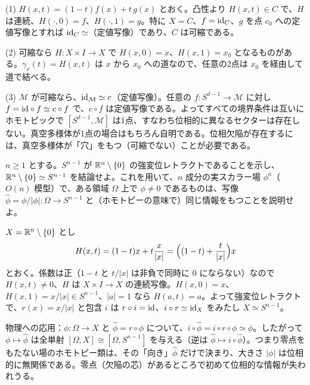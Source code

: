 \begin{solution}
(1) $H(x,t)=(1-t)f(x)+t\,g(x)$ とおく。凸性より $H(x,t)\in C$ で、$H$ は連続、$H(\cdot,0)=f$、$H(\cdot,1)=g$。特に $X=C$、$f=\mathrm{id}_C$、$g$ を点 $c_0$ への定値写像とすれば $\mathrm{id}_C\simeq$（定値写像）であり、$C$ は可縮である。

(2) 可縮なら $H\colon X\times I\to X$ で $H(x,0)=x$、$H(x,1)=x_0$ となるものがある。$\gamma_x(t)=H(x,t)$ は $x$ から $x_0$ への道なので、任意の2点は $x_0$ を経由して道で結べる。

(3) $\mathcal{M}$ が可縮なら、$\mathrm{id}_{\mathcal{M}}\simeq c$（定値写像）。任意の $f\colon S^{d-1}\to\mathcal{M}$ に対し $f=\mathrm{id}\circ f\simeq c\circ f$ で、$c\circ f$ は定値写像である。よってすべての境界条件は互いにホモトピックで $[S^{d-1},\mathcal{M}]$ は1点、すなわち位相的に異なるセクターは存在しない。真空多様体が1点の場合はもちろん自明である。位相欠陥が存在するには、真空多様体が「穴」をもつ（可縮でない）ことが必要である。
\end{solution}

\begin{problem}[難易度 B]\label{ch01-prob-punct}
$n\ge1$ とする。$S^{n-1}$ が $\mathbb{R}^n\setminus\{0\}$ の強変位レトラクトであることを示し、$\mathbb{R}^n\setminus\{0\}\simeq S^{n-1}$ を結論せよ。これを用いて、$n$ 成分の実スカラー場 $\phi^a$（$O(n)$ 模型）で、ある領域 $\Omega$ 上で $\phi\neq0$ であるものは、写像 $\hat\phi=\phi/\lvert\phi\rvert\colon\Omega\to S^{n-1}$ と（ホモトピーの意味で）同じ情報をもつことを説明せよ。
\end{problem}

\begin{solution}
$X=\mathbb{R}^n\setminus\{0\}$ とし
\[
H(x,t)=(1-t)x+t\frac{x}{\lvert x\rvert}=\Bigl((1-t)+\frac{t}{\lvert x\rvert}\Bigr)x
\]
とおく。係数は正（$1-t$ と $t/\lvert x\rvert$ は非負で同時に $0$ にならない）なので $H(x,t)\neq0$、$H$ は $X\times I\to X$ の連続写像。$H(x,0)=x$、$H(x,1)=x/\lvert x\rvert\in S^{n-1}$、$\lvert a\rvert=1$ なら $H(a,t)=a$。よって強変位レトラクトで、$r(x)=x/\lvert x\rvert$ と包含 $i$ は $r\circ i=\mathrm{id}$、$i\circ r\simeq\mathrm{id}_X$ をみたし $X\simeq S^{n-1}$。

物理への応用：$\phi\colon\Omega\to X$ と $\hat\phi=r\circ\phi$ について、$i\circ\hat\phi=i\circ r\circ\phi\simeq\phi$。したがって $\phi\mapsto\hat\phi$ は全単射 $[\Omega,X]\cong[\Omega,S^{n-1}]$ を与える（逆は $\hat\phi\mapsto i\circ\hat\phi$）。つまり零点をもたない場のホモトピー類は、その「向き」$\hat\phi$ だけで決まり、大きさ $\lvert\phi\rvert$ は位相的に無関係である。零点（欠陥の芯）があるところで初めて位相的な情報が失われうる。
\end{solution}

